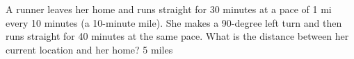{A runner leaves her home and runs straight for 30 minutes at a pace of 1 mi every 10 minutes (a 10-minute mile).  She makes a 90-degree left turn and then runs straight for 40 minutes at the same pace.  What is the distance between her current location and her home?}
{5 miles}

